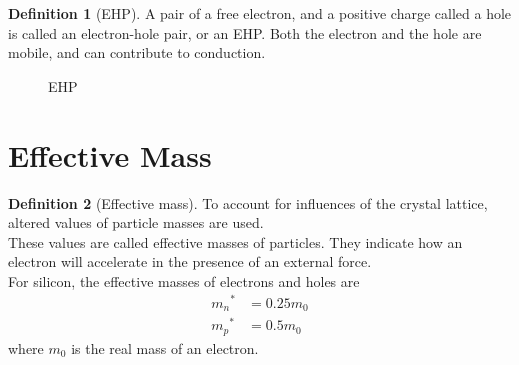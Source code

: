 \documentclass[titlepage, fleqn, a4paper, 12pt, twoside]{article}
\theoremstyle{definition}
\newtheorem{definition}{Definition}
\theoremstyle{theorem}
\let\Oldsection\section
\renewcommand{\section}{\FloatBarrier\Oldsection}
\begin{document}
\begin{definition}[EHP]
	A pair of a free electron, and a positive charge called a hole is called an electron-hole pair, or an EHP.
	Both the electron and the hole are mobile, and can contribute to conduction.
	\begin{figure}[H]
		\centering
		\caption{EHP}
	\end{figure}
\end{definition}

\section{Effective Mass}

\begin{definition}[Effective mass]
	To account for influences of the crystal lattice, altered values of particle masses are used.\\
	These values are called effective masses of particles.
	They indicate how an electron will accelerate in the presence of an external force.\\
	For silicon, the effective masses of electrons and holes are
	\begin{align*}
		{m_n}^* &= 0.25 m_0\\
		{m_p}^* &= 0.5 m_0
	\end{align*}
	where $m_0$ is the real mass of an electron.
\end{definition}
\end{document}
